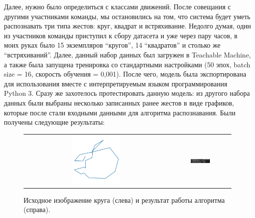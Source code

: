 
Далее, нужно было определиться с классами движений. После совещания с другими участниками команды, мы остановились на том, что система будет уметь распознавать три типа жестов: круг, квадрат и встряхивание. Недолго думая, один из участников команды приступил к сбору датасета и уже через пару часов, в моих руках было 15 экземпляров “кругов”, 14 “квадратов” и столько же “встряхиваний”. Далее, данный набор данных был загружен в Teachable Machine, а также была запущена тренировка со стандартными настройками (50 эпох, batch size = 16, скорость обучения = 0,001).  После чего, модель была экспортирована для использования вместе с интерпретируемым языком программирования Python 3. Сразу же захотелось протестировать данную модель: из другого набора данных были выбраны несколько записанных ранее жестов в виде графиков, которые после стали входными данными для алгоритма распознавания. Были получены следующие результаты:

\begin{figure}[H]
    \begin{center}
        \begin{tabular}{cc}
            \includegraphics[width=0.35\textwidth]{max_kt2_images/image4.jpg} & 
            \includegraphics[width=0.35\textwidth]{max_kt2_images/image11.png} \\
        \end{tabular}
    \end{center}
    \caption{Исходное изображение круга (слева) и результат работы алгоритма (справа).}
\end{figure}


